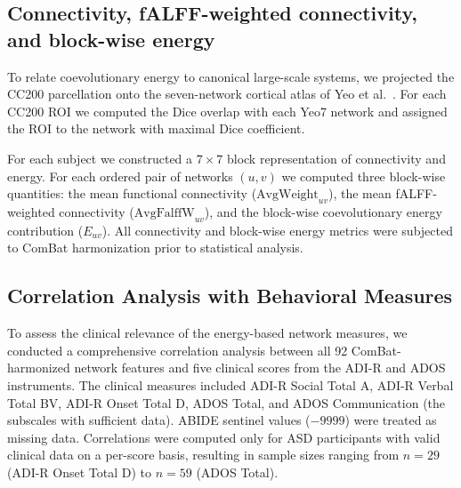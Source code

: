 \documentclass[10pt,letterpaper]{article}
\begin{document}
\subsection*{Connectivity, fALFF-weighted connectivity, and block-wise energy}

To relate coevolutionary energy to canonical large-scale systems, we projected the CC200
parcellation onto the seven-network cortical atlas of Yeo et al.\ \cite{Yeo2011}. For each CC200
ROI we computed the Dice overlap with each Yeo7 network and assigned the ROI to the network with
maximal Dice coefficient.

For each subject we constructed a $7\times7$ block representation of connectivity and energy. For
each ordered pair of networks $(u,v)$ we computed three block-wise quantities: the mean functional
connectivity ($\mathrm{AvgWeight}_{uv}$), the mean fALFF-weighted connectivity
($\mathrm{AvgFalffW}_{uv}$), and the block-wise coevolutionary energy contribution ($E_{uv}$). All
connectivity and block-wise energy metrics were subjected to ComBat harmonization prior to
statistical analysis.

\subsection*{Correlation Analysis with Behavioral Measures}

To assess the clinical relevance of the energy-based network measures, we conducted a comprehensive
correlation analysis between all 92 ComBat-harmonized network features and five clinical scores
from the ADI-R and ADOS instruments. The clinical measures included ADI-R Social Total A, ADI-R
Verbal Total BV, ADI-R Onset Total D, ADOS Total, and ADOS Communication (the subscales with
sufficient data). ABIDE sentinel values ($-9999$) were treated as missing
data. Correlations were computed only for ASD participants with valid clinical data on a per-score
basis, resulting in sample sizes ranging from $n = 29$ (ADI-R Onset Total D) to $n = 59$
(ADOS Total).
\end{document}
